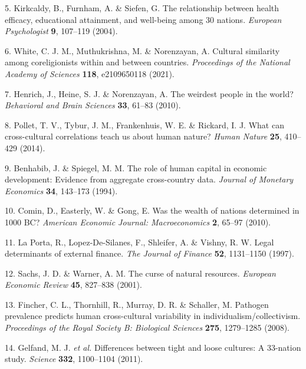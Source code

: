 \documentclass[english,man,floatsintext]{apa6}
\begin{document}
\leavevmode\hypertarget{ref-Kirkcaldy2004}{}%
5. Kirkcaldy, B., Furnham, A. \& Siefen, G. The relationship between health efficacy, educational attainment, and well-being among 30 nations. \emph{European Psychologist} \textbf{9}, 107--119 (2004).

\leavevmode\hypertarget{ref-White2021}{}%
6. White, C. J. M., Muthukrishna, M. \& Norenzayan, A. Cultural similarity among coreligionists within and between countries. \emph{Proceedings of the National Academy of Sciences} \textbf{118}, e2109650118 (2021).

\leavevmode\hypertarget{ref-Henrich2010}{}%
7. Henrich, J., Heine, S. J. \& Norenzayan, A. The weirdest people in the world? \emph{Behavioral and Brain Sciences} \textbf{33}, 61--83 (2010).

\leavevmode\hypertarget{ref-Pollet2014}{}%
8. Pollet, T. V., Tybur, J. M., Frankenhuis, W. E. \& Rickard, I. J. What can cross-cultural correlations teach us about human nature? \emph{Human Nature} \textbf{25}, 410--429 (2014).

\leavevmode\hypertarget{ref-Benhabib1994}{}%
9. Benhabib, J. \& Spiegel, M. M. The role of human capital in economic development: Evidence from aggregate cross-country data. \emph{Journal of Monetary Economics} \textbf{34}, 143--173 (1994).

\leavevmode\hypertarget{ref-Comin2010}{}%
10. Comin, D., Easterly, W. \& Gong, E. Was the wealth of nations determined in 1000 BC? \emph{American Economic Journal: Macroeconomics} \textbf{2}, 65--97 (2010).

\leavevmode\hypertarget{ref-LaPorta1997}{}%
11. La Porta, R., Lopez-De-Silanes, F., Shleifer, A. \& Vishny, R. W. Legal determinants of external finance. \emph{The Journal of Finance} \textbf{52}, 1131--1150 (1997).

\leavevmode\hypertarget{ref-Sachs2001}{}%
12. Sachs, J. D. \& Warner, A. M. The curse of natural resources. \emph{European Economic Review} \textbf{45}, 827--838 (2001).

\leavevmode\hypertarget{ref-Fincher2008}{}%
13. Fincher, C. L., Thornhill, R., Murray, D. R. \& Schaller, M. Pathogen prevalence predicts human cross-cultural variability in individualism/collectivism. \emph{Proceedings of the Royal Society B: Biological Sciences} \textbf{275}, 1279--1285 (2008).

\leavevmode\hypertarget{ref-Gelfand2011}{}%
14. Gelfand, M. J. \emph{et al.} Differences between tight and loose cultures: A 33-nation study. \emph{Science} \textbf{332}, 1100--1104 (2011).
\end{document}
